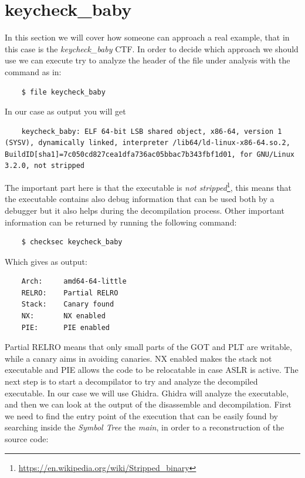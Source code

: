 \documentclass{article}
\begin{document}
\section{keycheck\_baby}
In this section we will cover how someone can approach a real example, that in this case is the \textit{keycheck\_baby} CTF.
In order to decide which approach we should use we can execute try to analyze the header of the file under analysis with the command as in:
\begin{verbatim}
    $ file keycheck_baby
\end{verbatim}
In our case as output you will get
\begin{verbatim}
    keycheck_baby: ELF 64-bit LSB shared object, x86-64, version 1 (SYSV), dynamically linked, interpreter /lib64/ld-linux-x86-64.so.2, BuildID[sha1]=7c050cd827cea1dfa736ac05bbac7b343fbf1d01, for GNU/Linux 3.2.0, not stripped
\end{verbatim}
The important part here is that the executable is \textit{not stripped}\footnote{\url{https://en.wikipedia.org/wiki/Stripped_binary}}, this means that the executable contains also debug information that can be used both by a debugger but it also helps during the decompilation process.
Other important information can be returned by running the following command:
\begin{verbatim}
    $ checksec keycheck_baby
\end{verbatim}
Which gives as output:
\begin{verbatim}
    Arch:     amd64-64-little
    RELRO:    Partial RELRO
    Stack:    Canary found
    NX:       NX enabled
    PIE:      PIE enabled
\end{verbatim}
Partial RELRO means that only small parts of the GOT and PLT are writable, while a canary aims in avoiding canaries. NX enabled makes the stack not executable and PIE allows the code to be relocatable in case ASLR is active.
The next step is to start a decompilator to try and analyze the decompiled executable. In our case we will use Ghidra. Ghidra will analyze the executable, and then we can look at the output of the disassemble and decompilation.
First we need to find the entry point of the execution that can be easily found by searching inside the \textit{Symbol Tree} the \textit{main}, in order to a reconstruction of the source code:
\end{document}
